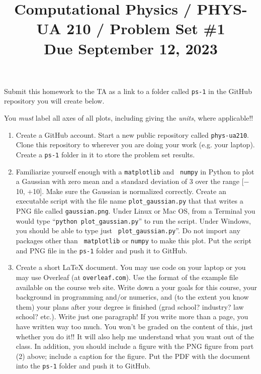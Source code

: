 \documentclass[11pt, preprint]{aastex}
\begin{document}
\title{\bf Computational Physics / PHYS-UA 210 / Problem Set \#1
\\ Due September 12, 2023 }

Submit this homework to the TA as a link to a folder called {\tt ps-1}
in the GitHub repository you will create below.

You {\it must} label all axes of all plots, including giving the {\it
  units}, where applicable!!

\begin{enumerate}

  \item Create a GitHub account. Start a new public repository called
    {\tt phys-ua210}. Clone this repository to wherever you are doing
    your work (e.g. your laptop). Create a {\tt ps-1} folder in it to
    store the problem set results.

  \item Familiarize yourself enough with a {\tt matplotlib} and {\tt
    numpy} in Python to plot a Gaussian with zero mean and a standard
    deviation of 3 over the range [$-$10, $+$10]. Make sure the
    Gaussian is normalized correctly. Create an executable script with
    the file name {\tt plot\_gaussian.py} that that writes a PNG file
    called {\tt gaussian.png}. Under Linux or Mac OS, from a Terminal
    you would type ``{\tt python plot\_gaussian.py}'' to run the
    script. Under Windows, you should be able to type just {\tt
      plot\_gaussian.py}''. Do not import any packages other than {\tt
      matplotlib} or {\tt numpy} to make this plot. Put the script and
    PNG file in the {\tt ps-1} folder and push it to GitHub.

  \item Create a short LaTeX document. You may use code on your laptop
    or you may use Overleaf (at {\tt overleaf.com}). Use the format of
    the example file available on the course web site. Write down a
    your goals for this course, your background in programming and/or
    numerics, and (to the extent you know them) your plans after your
    degree is finished (grad school? industry?  law school?
    etc.). Write just one paragraph! If you write more than a page,
    you have written way too much. You won't be graded on the content
    of this, just whether you do it!! It will also help me understand
    what you want out of the class. In addition, you should include a
    figure with the PNG figure from part (2) above; include a caption
    for the figure. Put the PDF with the document into the {\tt ps-1}
    folder and push it to GitHub.

\end{enumerate}
\end{document}
